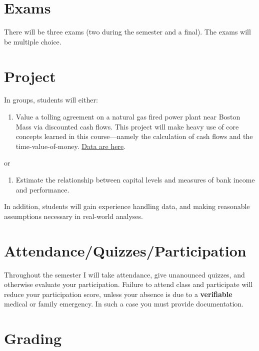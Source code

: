 \documentclass[11pt]{article}
\begin{document}
\section{Exams}
\label{sec:org9965b23}

There will be three exams (two during the semester and a final).  The exams will be multiple choice.

\section{Project}
\label{sec:orgb461463}

In groups, students will either:

\begin{enumerate}
\item Value a tolling agreement on a natural gas fired power plant near Boston Mass via discounted cash flows.  This project will make heavy use of core concepts learned in this course---namely the calculation of cash flows and the time-value-of-money.  \href{https://www.eia.gov/electricity/wholesale/\#history}{Data are here}.
\end{enumerate}

or 

\begin{enumerate}
\item Estimate the relationship between capital levels and measures of bank income and performance.
\end{enumerate}

In addition, students will gain experience handling data, and making reasonable assumptions necessary in real-world analyses.

\section{Attendance/Quizzes/Participation}
\label{sec:orgdc828af}

Throughout the semester I will take attendance, give unanounced quizzes, and otherwise evaluate your participation.  Failure to attend class and participate will reduce your participation score, unless your absence is due to a \textbf{\textbf{verifiable}} medical or family emergency.  In such a case you must provide documentation.

\section{Grading}
\label{sec:org4d07edd}
\end{document}
